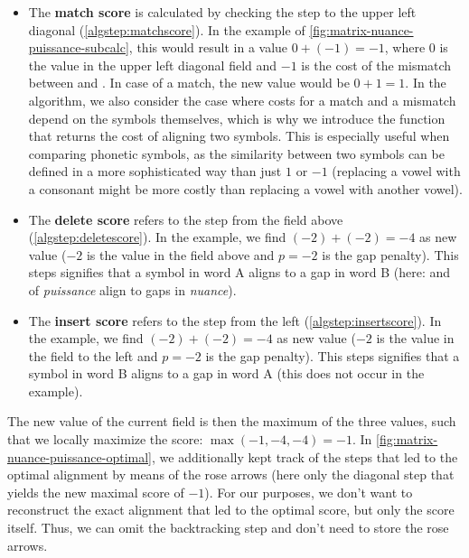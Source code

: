 \begin{itemize}

    \item The \textbf{match score} is calculated by checking the step to the upper left diagonal (\autoref{algstep:matchscore}). In the example of \autoref{fig:matrix-nuance-puissance-subcalc}, this would result in a value $0+(-1) = -1$, where $0$ is the value in the upper left diagonal field and $-1$ is the cost of the mismatch between  and . In case of a match, the new value would be $0 + 1 = 1$. In the algorithm, we also consider the case where costs for a match and a mismatch depend on the symbols themselves, which is why we introduce the function  that returns the cost of aligning two symbols. This is especially useful when comparing phonetic symbols, as the similarity between two symbols can be defined in a more sophisticated way than just $1$ or $-1$ (\eg replacing a vowel with a consonant might be more costly than replacing a vowel with another vowel).
    
    \item The \textbf{delete score} refers to the step from the field above (\autoref{algstep:deletescore}). In the example, we find $(-2) + (-2) = -4$ as new value ($-2$ is the value in the field above and $p=-2$ is the gap penalty). This steps signifies that a symbol in word A aligns to a gap in word B (here:  and  of \textit{puissance} align to gaps in \textit{nuance}).
    
    \item The \textbf{insert score} refers to the step from the left (\autoref{algstep:insertscore}). In the example, we find $(-2) + (-2) = -4$ as new value ($-2$ is the value in the field to the left and $p=-2$ is the gap penalty). This steps signifies that a symbol in word B aligns to a gap in word A (this does not occur in the example).

\end{itemize}

The new value of the current field is then the maximum of the three values, such that we locally maximize the score: $\max(-1, -4, -4) = -1$. In \autoref{fig:matrix-nuance-puissance-optimal}, we additionally kept track of the steps that led to the optimal alignment by means of the rose arrows (here only the diagonal step that yields the new maximal score of $-1$). For our purposes, we don't want to reconstruct the exact alignment that led to the optimal score, but only the score itself. Thus, we can omit the backtracking step and don't need to store the rose arrows.

